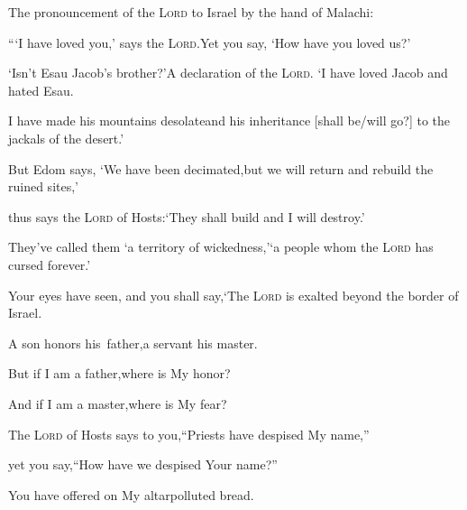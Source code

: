 
\begin{inparaenum}
   The pronouncement of the \textsc{Lord} to Israel by the hand of Malachi:\smallskip%
  
  \pa {} ``\thinspace`I have loved you,' says the \textsc{Lord}.\pa Yet you say, `How have you loved us?'%
  
  \pb `Isn't Esau Jacob's brother?'\pa A declaration of the \textsc{Lord}.%
  \pa `I have loved Jacob\pa {} and hated Esau.%
  
  \pb I have made his mountains desolate\pa and his inheritance [shall be/will go?] to the jackals%
  of the desert.'%
  
  \pa {} But Edom says, `We have been decimated,\pa but we will return and rebuild the ruined sites,'%
  
  \pb thus says the \textsc{Lord} of Hosts:\pa `They shall build and I will destroy.'%
  
  \pb They've called%
  them `a territory of wickedness,'\pa `a people whom the \textsc{Lord} has cursed forever.'%
  
  \pa {} Your eyes have seen, and you shall say,\pa `The \textsc{Lord} is exalted beyond the border of Israel.%
  
  \pb {} A son honors his\understood\ father,\pa a servant his master.%
  
  \pc But if I am a father,\pa where is My honor?%
  
  \pc And if I am a master,\pa where is My fear?%
  
  \pc The \textsc{Lord} of Hosts says to you,\pa ``Priests have despised My name,''%
  
  \pc yet you say,\pa ``How have we despised Your name?''%
  
  \pb {} You have offered on My altar\pa polluted%
  bread.%
  

\end{inparaenum}

